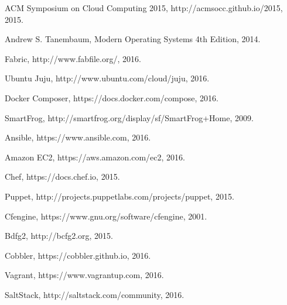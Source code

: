 \documentclass[conference, spanish]{IEEEtran}
\begin{document}

%
%
%
\begin{thebibliography}{1}




 ACM Symposium on Cloud Computing 2015, http://acmsocc.github.io/2015, 2015.

 Andrew S. Tanembaum, Modern Operating Systems 4th Edition, 2014.

Fabric, http://www.fabfile.org/, 2016.

Ubuntu Juju, http://www.ubuntu.com/cloud/juju, 2016.

Docker Composer, https://docs.docker.com/compose, 2016.

SmartFrog, http://smartfrog.org/display/sf/SmartFrog+Home, 2009.

Ansible, https://www.ansible.com, 2016.

Amazon EC2, https://aws.amazon.com/ec2, 2016.

Chef, https://docs.chef.io, 2015.

Puppet, http://projects.puppetlabs.com/projects/puppet, 2015.

Cfengine, https://www.gnu.org/software/cfengine, 2001.

Bdfg2, http://bcfg2.org, 2015.

Cobbler, https://cobbler.github.io, 2016.

Vagrant, https://www.vagrantup.com, 2016.

SaltStack, http://saltstack.com/community, 2016.


\end{thebibliography}
\end{document}
